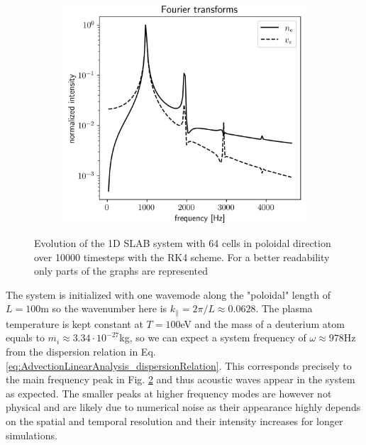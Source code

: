 \begin{figure}[H]
\begin{subfigure}[b]{0.32\textwidth}
		\label{fig:AdvectionSLAB_velocityEvolution}
	\end{subfigure}
	\begin{subfigure}[b]{0.32\textwidth}
		\centering
		\includegraphics[width=1\textwidth]{schemes/AdvectionSLAB_FFT.png}
		\label{fig:AdvectionSLAB_FFT}
	\end{subfigure}
	\caption[Evolution of the 1D SLAB system with 64 cells in poloidal direction over 10000 timesteps with the RK4 scheme]{Evolution of the 1D SLAB system with 64 cells in poloidal direction over 10000 timesteps with the RK4 scheme. For a better readability only parts of the graphs are represented}
	\label{fig:AdvectionSLAB}
\end{figure}

The system is initialized with one wavemode along the "poloidal" length of $L=100$m so the wavenumber here is $k_\parallel = 2\pi / L \approx 0.0628$. The plasma temperature is kept constant at $T = 100$eV and the mass of a deuterium atom equals to $m_i \approx 3.34\cdot 10^{-27}$kg, so we can expect a system frequency of $\omega\approx 978$Hz from the dispersion relation in Eq. \ref{eq:AdvectionLinearAnalysis_dispersionRelation}. This corresponds precisely to the main frequency peak in Fig. \ref{fig:AdvectionSLAB_FFT} and thus acoustic waves appear in the system as expected. The smaller peaks at higher frequency modes are however not physical and are likely due to numerical noise as their appearance highly depends on the spatial and temporal resolution and their intensity increases for longer simulations. 


